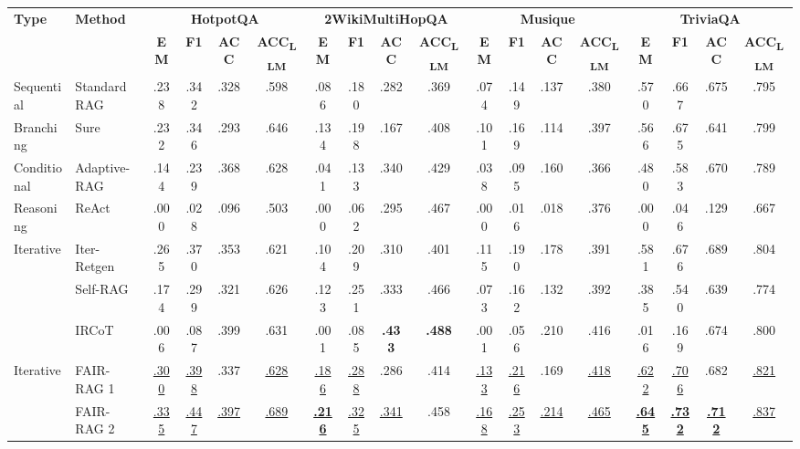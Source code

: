\documentclass[11pt]{article}
\begin{document}
\begin{table}[t]
\centering
\scriptsize
\setlength{\tabcolsep}{3pt}
\begin{tabular}{llcccccccccccccccc}
\hline
\multirow{2}{*}{\textbf{Type}} & \multirow{2}{*}{\textbf{Method}} & \multicolumn{4}{c}{\textbf{HotpotQA}} & \multicolumn{4}{c}{\textbf{2WikiMultiHopQA}} & \multicolumn{4}{c}{\textbf{Musique}} & \multicolumn{4}{c}{\textbf{TriviaQA}} \\
\cline{3-18}
& & \textbf{EM} & \textbf{F1} & \textbf{ACC} & \textbf{ACC\textsubscript{LLM}} & \textbf{EM} & \textbf{F1} & \textbf{ACC} & \textbf{ACC\textsubscript{LLM}} & \textbf{EM} & \textbf{F1} & \textbf{ACC} & \textbf{ACC\textsubscript{LLM}} & \textbf{EM} & \textbf{F1} & \textbf{ACC} & \textbf{ACC\textsubscript{LLM}} \\
\hline
Sequential & Standard RAG & .238 & .342 & .328 & .598 & .086 & .180 & .282 & .369 & .074 & .149 & .137 & .380 & .570 & .667 & .675 & .795 \\
Branching & Sure & .232 & .346 & .293 & .646 & .134 & .198 & .167 & .408 & .101 & .169 & .114 & .397 & .566 & .675 & .641 & .799 \\
Conditional & Adaptive-RAG & .144 & .239 & .368 & .628 & .041 & .133 & .340 & .429 & .038 & .095 & .160 & .366 & .480 & .583 & .670 & .789 \\
Reasoning & ReAct & .000 & .028 & .096 & .503 & .000 & .062 & .295 & .467 & .000 & .016 & .018 & .376 & .000 & .046 & .129 & .667 \\
\multirow{3}{*}{Iterative} & Iter-Retgen & .265 & .370 & .353 & .621 & .104 & .209 & .310 & .401 & .115 & .190 & .178 & .391 & .581 & .676 & .689 & .804 \\
& Self-RAG & .174 & .299 & .321 & .626 & .123 & .251 & .333 & .466 & .073 & .162 & .132 & .392 & .385 & .540 & .639 & .774 \\
& IRCoT & .006 & .087 & .399 & .631 & .001 & .085 & \textbf{.433} & \textbf{.488} & .001 & .056 & .210 & .416 & .016 & .169 & .674 & .800 \\
\hline
\multirow{6}{*}{Iterative} & FAIR-RAG 1 & \underline{.300} & \underline{.398} & .337 & \underline{.628} & \underline{.186} & \underline{.288} & .286 & .414 & \underline{.133} & \underline{.216} & .169 & \underline{.418} & \underline{.622} & \underline{.706} & .682 & \underline{.821} \\
& FAIR-RAG 2 & \underline{.335} & \underline{.447} & \underline{.397} & \underline{.689} & \underline{\textbf{.216}} & \underline{.325} & \underline{.341} & .458 & \underline{.168} & \underline{.253} & \underline{.214} & \underline{.465} & \underline{\textbf{.645}} & \underline{\textbf{.732}} & \underline{\textbf{.712}} & \underline{.837} \\

\end{tabular}
\end{table}
\end{document}
